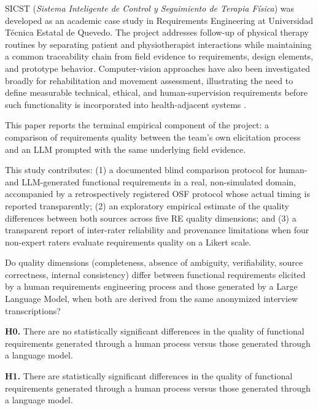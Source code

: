 \documentclass[pdflatex,sn-basic]{sn-jnl}
\begin{document}
SICST (\textit{Sistema Inteligente de Control y Seguimiento de Terapia Física}) was developed as an academic case study in Requirements Engineering at Universidad Técnica Estatal de Quevedo. The project addresses follow-up of physical therapy routines by separating patient and physiotherapist interactions while maintaining a common traceability chain from field evidence to requirements, design elements, and prototype behavior. Computer-vision approaches have also been investigated broadly for rehabilitation and movement assessment, illustrating the need to define measurable technical, ethical, and human-supervision requirements before such functionality is incorporated into health-adjacent systems \citep{debnath2022rehabilitation,oecd2019ai}.

This paper reports the terminal empirical component of the project: a comparison of requirements quality between the team's own elicitation process and an LLM prompted with the same underlying field evidence.

This study contributes: (1) a documented blind comparison protocol for human- and LLM-generated functional requirements in a real, non-simulated domain, accompanied by a retrospectively registered OSF protocol whose actual timing is reported transparently; (2) an exploratory empirical estimate of the quality differences between both sources across five RE quality dimensions; and (3) a transparent report of inter-rater reliability and provenance limitations when four non-expert raters evaluate requirements quality on a Likert scale.

\begin{description}[leftmargin=1.3cm,labelwidth=1.0cm]
\item[RQ1.] Do quality dimensions (completeness, absence of ambiguity, verifiability, source correctness, internal consistency) differ between functional requirements elicited by a human requirements engineering process and those generated by a Large Language Model, when both are derived from the same anonymized interview transcriptions?
\end{description}

\noindent\textbf{H0.} There are no statistically significant differences in the quality of functional requirements generated through a human process versus those generated through a language model.

\noindent\textbf{H1.} There are statistically significant differences in the quality of functional requirements generated through a human process versus those generated through a language model.
\end{document}
